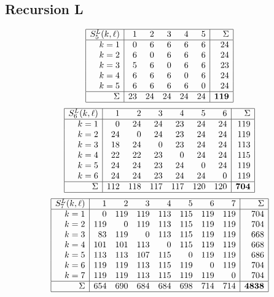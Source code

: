 \documentclass[11pt]{amsart}
\theoremstyle{definition}
\begin{document}
\subsection{Recursion L}
\[ \begin{array}{|r|rrrrr|r|}
\hline
S^L_{5}(k, \ell)
& 1 & 2 & 3 & 4 & 5 & \Sigma \\ \hline
k= 1 & 0 & 6 & 6 & 6 & 6 & 24 \\
k= 2 & 6 & 0 & 6 & 6 & 6 & 24 \\
k= 3 & 5 & 6 & 0 & 6 & 6 & 23 \\
k= 4 & 6 & 6 & 6 & 0 & 6 & 24 \\
k= 5 & 6 & 6 & 6 & 6 & 0 & 24 \\
\hline
\Sigma & 23 & 24 & 24 & 24 & 24 & \mathbf{119}
\\ \hline
\end{array}
\]
\[ \begin{array}{|r|rrrrrr|r|}
\hline
S^L_{6}(k, \ell)
& 1 & 2 & 3 & 4 & 5 & 6 & \Sigma \\ \hline
k= 1 & 0 & 24 & 24 & 23 & 24 & 24 & 119 \\
k= 2 & 24 & 0 & 24 & 23 & 24 & 24 & 119 \\
k= 3 & 18 & 24 & 0 & 23 & 24 & 24 & 113 \\
k= 4 & 22 & 22 & 23 & 0 & 24 & 24 & 115 \\
k= 5 & 24 & 24 & 23 & 24 & 0 & 24 & 119 \\
k= 6 & 24 & 24 & 23 & 24 & 24 & 0 & 119 \\
\hline
\Sigma & 112 & 118 & 117 & 117 & 120 & 120 & \mathbf{704}
\\ \hline
\end{array}
\]
\[ \begin{array}{|r|rrrrrrr|r|}
\hline
S^L_{7}(k, \ell)
& 1 & 2 & 3 & 4 & 5 & 6 & 7 & \Sigma \\ \hline
k= 1 & 0 & 119 & 119 & 113 & 115 & 119 & 119 & 704 \\
k= 2 & 119 & 0 & 119 & 113 & 115 & 119 & 119 & 704 \\
k= 3 & 83 & 119 & 0 & 113 & 115 & 119 & 119 & 668 \\
k= 4 & 101 & 101 & 113 & 0 & 115 & 119 & 119 & 668 \\
k= 5 & 113 & 113 & 107 & 115 & 0 & 119 & 119 & 686 \\
k= 6 & 119 & 119 & 113 & 115 & 119 & 0 & 119 & 704 \\
k= 7 & 119 & 119 & 113 & 115 & 119 & 119 & 0 & 704 \\
\hline
\Sigma & 654 & 690 & 684 & 684 & 698 & 714 & 714 & \mathbf{4838}
\\ \hline
\end{array}
\]
\end{document}
